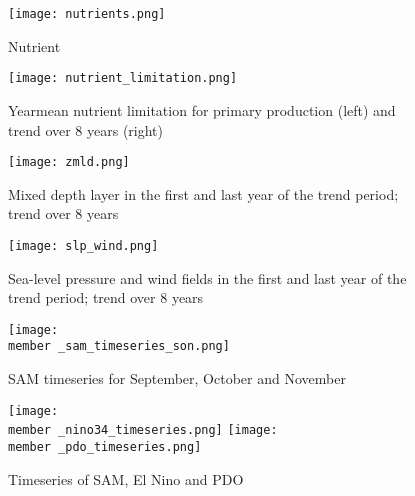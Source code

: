 \documentclass[12pt]{article}
\newcommand{\member}{m182_1988_1995} %
\begin{document}
\newpage
\begin{figure}
\texttt{[image: nutrients.png]} %
\caption{Nutrient}
\label{fig:nutrients}
\end{figure}
\begin{figure}
\texttt{[image: nutrient\_limitation.png]} %
\caption{Yearmean nutrient limitation for primary production (left) and trend over 8 years (right)}
\label{fig:nutrient_limitation}
\end{figure}
\begin{figure}
\texttt{[image: zmld.png]} %
\caption{Mixed depth layer in the first and last year of the trend period; trend over 8 years}
\label{fig:zmld}
\end{figure}
\begin{figure}
\texttt{[image: slp\_wind.png]} %
\caption{Sea-level pressure and wind fields in the first and last year of the trend period; trend over 8 years}
\label{fig:slp_wind}
\end{figure}

\clearpage
\begin{figure}[h]
\texttt{[image: \\member \_sam\_timeseries\_son.png]} %
\caption{SAM timeseries for September, October and November}
\texttt{[image: \\member \_nino34\_timeseries.png]} %
\texttt{[image: \\member \_pdo\_timeseries.png]} %
\caption{Timeseries of SAM, El Nino and PDO}
\label{fig:CVDP}
\end{figure}

\clearpage




\end{document}
